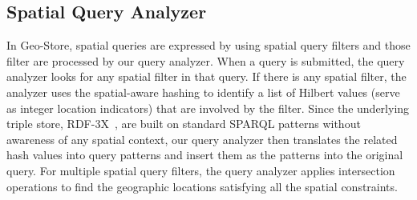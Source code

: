 \subsection{Spatial Query Analyzer}

In Geo-Store, spatial queries are expressed by using spatial query
filters and those filter are processed by our query analyzer.
When a query is submitted, the query analyzer looks for any
spatial filter in that query. If there is any spatial filter, the
analyzer uses the spatial-aware hashing to identify a list of
Hilbert values (serve as integer location indicators) that are
involved by the filter. Since the underlying triple store,
RDF-3X~\cite{DBLP:journals/vldb/NeumannW10}, are built on standard
SPARQL patterns without awareness of any spatial context, our
query analyzer then translates the related hash values into query
patterns and insert them as the patterns into the original query.
For multiple spatial query filters, the query analyzer applies
intersection operations to find the geographic locations
satisfying all the spatial constraints.

